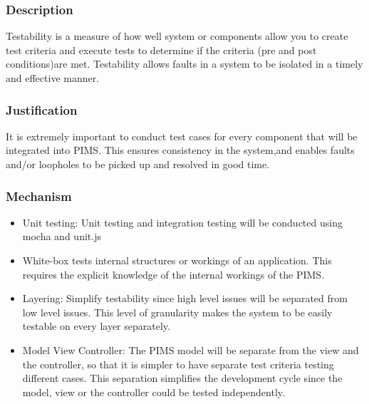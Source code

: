 	\subsubsection*{Description}
		Testability is a measure of how well system or components allow you to create test criteria and execute tests to determine if the criteria (pre and post conditions)are met. Testability allows faults in a system to be isolated in a timely and effective manner.
		
		
	\subsubsection*{Justification}
	It is extremely important to conduct test cases for every component that will be integrated into PIMS. This ensures consistency in the system,and enables faults and/or loopholes to be picked up and resolved in good time.
	
	\subsubsection*{Mechanism}
	\begin{itemize}
			\item Unit testing: Unit testing and integration testing will be conducted using mocha and unit.js
			\item	White-box tests internal structures or workings of an application. This requires the explicit knowledge of the internal workings of the PIMS.
			\item	Layering:  Simplify testability since high level issues will be separated from low level issues. This level of granularity makes the system to be easily testable on every layer separately.
			\item Model View Controller: The PIMS model will be separate from the view and the controller, so that it is simpler to have separate test criteria testing different cases. This separation simplifies the development cycle since the model, view or the controller could be tested independently. 
	\end{itemize}
